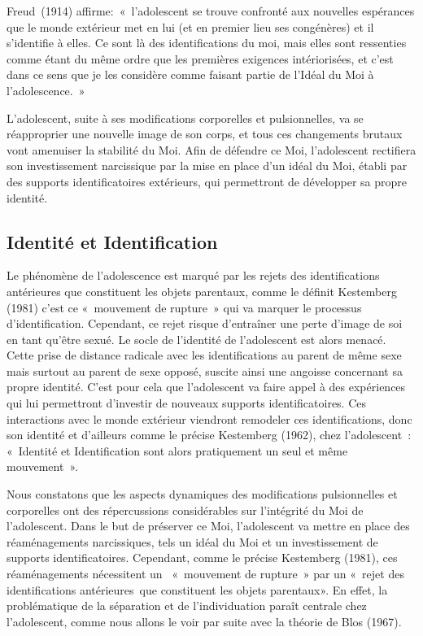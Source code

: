 \documentclass[12pt, a4paper]{book}
\begin{document}
\begin{spacing}{1.5}
Freud (1914) affirme: « l'adolescent se trouve confronté aux nouvelles espérances que le monde extérieur met en lui (et en premier lieu ses congénères) et il s'identifie à elles. Ce sont là des identifications du moi, mais elles sont ressenties comme étant du même ordre que les premières exigences intériorisées, et c'est dans ce sens que je les considère comme faisant partie de l'Idéal du Moi à l'adolescence. »

L'adolescent, suite à ses modifications corporelles et pulsionnelles, va se réapproprier une nouvelle image de son corps, et tous ces changements brutaux vont amenuiser la stabilité du Moi. Afin de défendre ce Moi, l'adolescent rectifiera son investissement narcissique par la mise en place d'un idéal du Moi, établi par des supports identificatoires extérieurs, qui permettront de développer sa propre identité.

\subsection{Identité et Identification}

Le phénomène de l'adolescence est marqué par les rejets des identifications antérieures que  constituent les objets parentaux, comme le définit Kestemberg (1981) c'est ce « mouvement de rupture » qui va marquer le processus d'identification. Cependant, ce rejet risque d'entraîner une perte d'image de soi en tant qu'être sexué. Le socle de l'identité de l'adolescent est alors menacé. Cette prise de distance radicale  avec les identifications au parent de même sexe mais surtout au parent de sexe opposé, suscite ainsi une angoisse concernant sa propre identité. C'est pour cela que l'adolescent va faire appel à des expériences qui lui permettront d'investir de nouveaux supports identificatoires. Ces interactions avec le monde extérieur viendront remodeler ces identifications, donc son identité et d'ailleurs comme le précise Kestemberg (1962), chez l'adolescent : « Identité et Identification sont alors pratiquement un seul et même mouvement ».

Nous constatons que les aspects dynamiques des modifications pulsionnelles et corporelles ont des répercussions considérables sur l'intégrité du Moi de l'adolescent. Dans le but de préserver ce Moi, l'adolescent va mettre en place des réaménagements narcissiques, tels un  idéal du Moi et un investissement de supports identificatoires. Cependant, comme le précise Kestemberg (1981), ces réaménagements nécessitent un  « mouvement de rupture » par un « rejet des identifications antérieures que constituent les objets parentaux».  En effet, la problématique de la séparation et de l'individuation paraît centrale chez l'adolescent, comme nous allons le voir par suite avec la théorie de Blos (1967).


\end{spacing}
\end{document}
